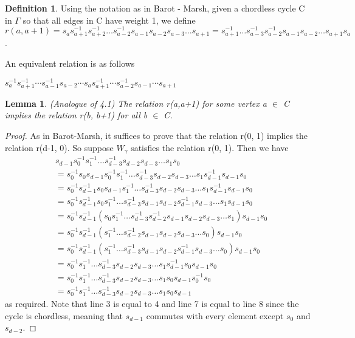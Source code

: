 \documentclass[11pt]{amsart}
\newtheorem{lem}[thm]{Lemma}
\theoremstyle{definition}
\newtheorem{defn}[thm]{Definition}
\begin{document}
\begin{defn}
Using the notation as in Barot - Marsh, given a chordless cycle C in $\Gamma$ so that all edges in C have weight 1, we define $r(a, a+1) = s_{a}s_{a+1}^{-1}s_{a+2}^{-1}\dots s_{a-2}^{-1}s_{a-1}s_{a-2}s_{a-3}\dots s_{a+1} = s_{a+1}^{-1}\dots s_{a-3}^{-1}s_{a-2}^{-1}s_{a-1}s_{a-2}\dots s_{a+1}s_{a}$.

An equivalent relation is as follows

$s_a^{-1} s_{a+1}^{-1}\cdots s_{a-1}^{-1}s_{a-2}\cdots s_a s_{a+1}^{-1}\cdots s_{a-2}^{-1} s_{a-1}\cdots s_{a+1}$
\end{defn}

\begin{lem} (Analogue of 4.1)
The relation r(a,a+1) for some vertex a $\in$ C implies the relation r(b, b+1) for all b $\in$ C.
\end{lem}
\begin{proof}
As in Barot-Marsh, it suffices to prove that the relation r(0, 1) implies the relation r(d-1, 0). So suppose $W_{\gamma}$ satisfies the relation r(0, 1). Then we have 
\begin{align*}
& s_{d-1}s_{0}^{-1}s_{1}^{-1}\dots s_{d-3}^{-1}s_{d-2}s_{d-3}\dots s_1s_0 \\
&= s_{0}^{-1}s_{0}s_{d-1}s_{0}^{-1}s_{1}^{-1}\dots s_{d-3}^{-1}s_{d-2}s_{d-3}\dots s_{1}s_{d-1}^{-1}s_{d-1}s_{0} \\
&= s_{0}^{-1}s_{d-1}^{-1}s_{0}s_{d-1}s_{1}^{-1}\dots s_{d-3}^{-1}s_{d-2}s_{d-3}\dots s_{1}s_{d-1}^{-1}s_{d-1}s_{0} \\
&= s_{0}^{-1}s_{d-1}^{-1}s_{0}s_{1}^{-1}\dots s_{d-3}^{-1}s_{d-1}s_{d-2}s_{d-1}^{-1}s_{d-3}\dots s_{1}s_{d-1}s_{0} \\
&= s_{0}^{-1}s_{d-1}^{-1}(s_{0}s_{1}^{-1}\dots s_{d-3}^{-1}s_{d-2}^{-1}s_{d-1}s_{d-2}s_{d-3}\dots s_{1})s_{d-1}s_{0} \\
&= s_{0}^{-1}s_{d-1}^{-1}(s_{1}^{-1} \dots s_{d-2}^{-1}s_{d-1}s_{d-2}s_{d-3}\dots s_{0})s_{d-1}s_{0} \\
&= s_{0}^{-1}s_{d-1}^{-1}(s_{1}^{-1} \dots s_{d-3}^{-1}s_{d-1}s_{d-2}s_{d-1}^{-1}s_{d-3}\dots s_{0})s_{d-1}s_{0} \\
&= s_{0}^{-1}s_{1}^{-1}\dots s_{d-3}^{-1}s_{d-2}s_{d-3}\dots s_{1}s_{d-1}^{-1}s_{0}s_{d-1}s_{0} \\
&= s_{0}^{-1}s_{1}^{-1}\dots s_{d-3}^{-1}s_{d-2}s_{d-3}\dots s_{1}s_{0}s_{d-1}s_{0}^{-1}s_{0} \\
&= s_{0}^{-1}s_{1}^{-1}\dots s_{d-3}^{-1}s_{d-2}s_{d-3}\dots s_{1}s_{0}s_{d-1} 
\end{align*}
as required. Note that line 3 is equal to 4 and line 7 is equal to line 8 since the cycle is chordless, meaning that $s_{d-1}$ commutes with every element except $s_{0}$ and $s_{d-2}$.
\end{proof}
\end{document}
